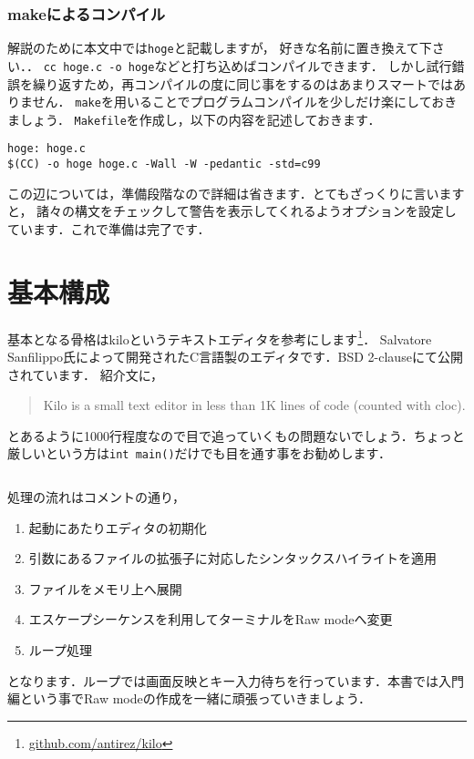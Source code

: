 \subsubsection{makeによるコンパイル}
解説のために本文中では\texttt{hoge}と記載しますが，
好きな名前に置き換えて下さい．．
\texttt{cc hoge.c -o hoge}などと打ち込めばコンパイルできます．
しかし試行錯誤を繰り返すため，再コンパイルの度に同じ事をするのはあまりスマートではありません．
\texttt{make}を用いることでプログラムコンパイルを少しだけ楽にしておきましょう．
\texttt{Makefile}を作成し，以下の内容を記述しておきます．
\begin{verbatim}
hoge: hoge.c
$(CC) -o hoge hoge.c -Wall -W -pedantic -std=c99
\end{verbatim}
この辺については，準備段階なので詳細は省きます．とてもざっくりに言いますと，
諸々の構文をチェックして警告を表示してくれるようオプションを設定しています．これで準備は完了です．

\section{基本構成}
基本となる骨格はkiloというテキストエディタを参考にします\footnote{\href{https://github.com/antirez/kilo}{github.com/antirez/kilo}}．
Salvatore Sanfilippo氏によって開発されたC言語製のエディタです．BSD 2-clauseにて公開されています．
紹介文に，
\begin{quote}
Kilo is a small text editor in less than 1K lines of code (counted with cloc).
\end{quote}
とあるように1000行程度なので目で追っていくもの問題ないでしょう．ちょっと厳しいという方は\texttt{int main()}だけでも目を通す事をお勧めします．
\inputminted[frame=lines,framesep=2mm,baselinestretch=1.2,fontsize=\footnotesize,linenos,breaklines]{c}{\takuzooasset/main.c}
処理の流れはコメントの通り，
\begin{enumerate}
\item 起動にあたりエディタの初期化
\item 引数にあるファイルの拡張子に対応したシンタックスハイライトを適用
\item ファイルをメモリ上へ展開
\item エスケープシーケンスを利用してターミナルをRaw modeへ変更
\item ループ処理
\end{enumerate}
となります．ループでは画面反映とキー入力待ちを行っています．本書では入門編という事でRaw modeの作成を一緒に頑張っていきましょう．

